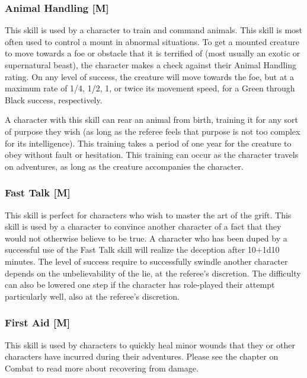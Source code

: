 \documentclass[oneside]{book}
\begin{document}
\begin{multicols}{2}
\subsubsection{Animal Handling [M]}
This skill is used by a character to train and command animals. This skill is most often used to control a mount in abnormal situations. To get a mounted creature to move towards a foe or obstacle that it is terrified of (most usually an exotic or supernatural beast), the character makes a check against their Animal Handling rating. On any level of success, the creature will move towards the foe, but at a maximum rate of 1/4, 1/2, 1, or twice its movement speed, for a Green through Black success, respectively.

A character with this skill can rear an animal from birth, training it for any sort of purpose they wish (as long as the referee feels that purpose is not too complex for its intelligence). This training takes a period of one year for the creature to obey without fault or hesitation. This training can occur as the character travels on adventures, as long as the creature accompanies the character. 

\subsubsection{Fast Talk [M]}
This skill is perfect for characters who wish to master the art of the grift. This skill is used by a character to convince another character of a fact that they would not otherwise believe to be true. A character who has been duped by a successful use of the Fast Talk skill will realize the deception after 10+1d10 minutes. The level of success require to successfully swindle another character depends on the unbelievability of the lie, at the referee's discretion. The difficulty can also be lowered one step if the character has role-played their attempt particularly well, also at the referee's discretion. 

\subsubsection{First Aid [M]}
This skill is used by characters to quickly heal minor wounds that they or other characters have incurred during their adventures. Please see the chapter on Combat to read more about recovering from damage.


\end{multicols}
\end{document}
